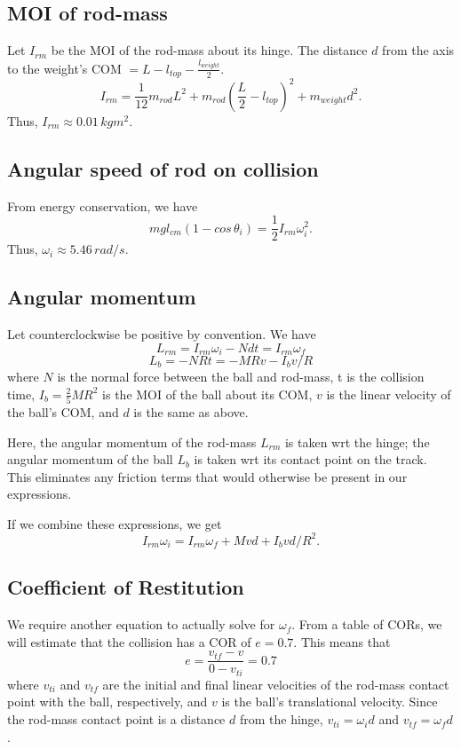 \documentclass[12pt]{article} %
\begin{document}
\subsection{MOI of rod-mass}

Let $I_{rm}$ be the MOI of the rod-mass about its hinge. The distance $d$ from the axis to the weight's COM $= L - l_{top} - \frac{l_{weight}}{2}$.
$$I_{rm} = \frac{1}{12}m_{rod}L^2 + m_{rod}(\frac{L}{2} - l_{top})^2 + m_{weight}d^2.$$
Thus, $I_{rm} \approx 0.01\, kgm^2$.

\subsection{Angular speed of rod on collision}

From energy conservation, we have
$$mgl_{cm}(1-cos\,\theta_i) = \frac{1}{2}I_{rm}\omega_i^2.$$
Thus, $\omega_i \approx 5.46\, rad/s$.

\subsection{Angular momentum}

Let counterclockwise be positive by convention. We have
$$L_{rm} = I_{rm}\omega_i - Ndt = I_{rm}\omega_f$$
$$L_b = -NRt = -MRv - I_b v/R$$
where $N$ is the normal force between the ball and rod-mass, t is the collision time, $I_b = \frac{2}{5}MR^2$ is the MOI of the ball about its COM, $v$ is the linear velocity of the ball's COM, and $d$ is the same as above.

Here, the angular momentum of the rod-mass $L_{rm}$ is taken wrt the hinge; the angular momentum of the ball $L_b$ is taken wrt its contact point on the track. This eliminates any friction terms that would otherwise be present in our expressions.

If we combine these expressions, we get
$$I_{rm} \omega_i = I_{rm} \omega_f + Mvd + I_b vd/R^2.$$

\subsection{Coefficient of Restitution}

We require another equation to actually solve for $\omega_f$. From a table of CORs, we will estimate that the collision has a COR of $e = 0.7$.
This means that $$e = \frac{v_{tf} - v}{0-v_{ti}} = 0.7$$
where $v_{ti}$ and $v_{tf}$ are the initial and final linear velocities of the rod-mass contact point with the ball, respectively, and $v$ is the ball's translational velocity.
Since the rod-mass contact point is a distance $d$ from the hinge, $v_{ti} = \omega_i d$ and $v_{tf} = \omega_f d$.
\end{document}
